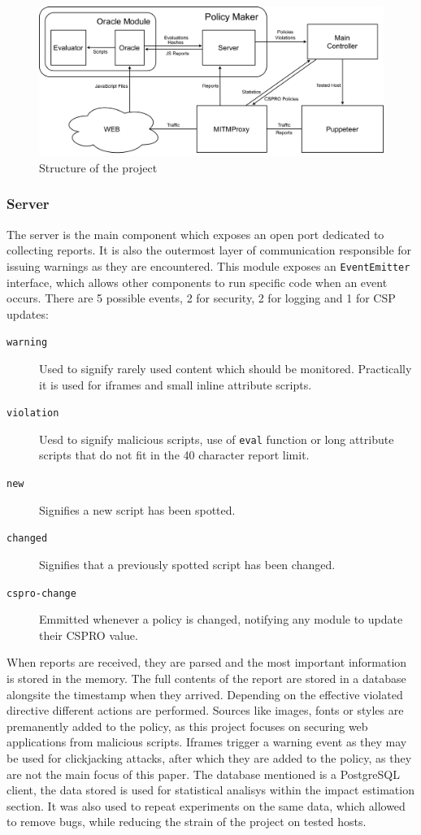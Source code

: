 \begin{figure}[h]
	\centering
	\includegraphics[width=\textwidth]{imgs/project_structure.png}
	\caption{Structure of the project}
	\label{structure}
\end{figure}

\subsubsection{Server}
The server is the main component which exposes an open port dedicated to collecting reports.
It is also the outermost layer of communication responsible for issuing warnings as they are encountered.
This module exposes an \texttt{EventEmitter} interface, which allows other components to run specific code when an event occurs.
There are 5 possible events, 2 for security, 2 for logging and 1 for CSP updates:
\begin{description}
	\item[\texttt{warning}]	Used to signify rarely used content which should be monitored. Practically it is used for iframes and small inline attribute scripts. 
	\item[\texttt{violation}] Uesd to signify malicious scripts, use of \texttt{eval} function or long attribute scripts that do not fit in the 40 character report limit.
	\item[\texttt{new}] Signifies a new script has been spotted.
	\item[\texttt{changed}] Signifies that a previously spotted script has been changed.
	\item[\texttt{cspro-change}] Emmitted whenever a policy is changed, notifying any module to update their CSPRO value.
\end{description}

When reports are received, they are parsed and the most important information is stored in the memory.
The full contents of the report are stored in a database alongsite the timestamp when they arrived.
Depending on the effective violated directive different actions are performed.
Sources like images, fonts or styles are premanently added to the policy, as this project focuses on securing web applications from malicious scripts.
Iframes trigger a warning event as they may be used for clickjacking attacks, after which they are added to the policy, as they are not the main focus of this paper.
The database mentioned is a PostgreSQL client, the data stored is used for statistical analisys within the impact estimation section.
It was also used to repeat experiments on the same data, which allowed to remove bugs, while reducing the strain of the project on tested hosts.

